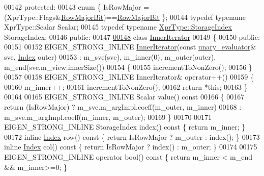 \begin{DoxyCode}
00142   \textcolor{keyword}{protected}:
00143     \textcolor{keyword}{enum} \{ IsRowMajor = (XprType::Flags&\hyperlink{group__flags_gae4f56c2a60bbe4bd2e44c5b19cbe8762}{RowMajorBit})==\hyperlink{group__flags_gae4f56c2a60bbe4bd2e44c5b19cbe8762}{RowMajorBit} \};
00144     \textcolor{keyword}{typedef} \textcolor{keyword}{typename} XprType::Scalar Scalar;
00145     \textcolor{keyword}{typedef} \textcolor{keyword}{typename} \hyperlink{group___sparse_core___module_a0b540ba724726ebe953f8c0df06081ed}{XprType::StorageIndex} StorageIndex;
00146   \textcolor{keyword}{public}:
00147     
\hyperlink{class_eigen_1_1internal_1_1unary__evaluator_3_01_sparse_view_3_01_arg_type_01_4_00_01_index_based_01_4_1_1_inner_iterator}{00148}     \textcolor{keyword}{class }\hyperlink{class_eigen_1_1_inner_iterator}{InnerIterator}
00149     \{
00150       \textcolor{keyword}{public}:
00151 
00152         EIGEN\_STRONG\_INLINE \hyperlink{class_eigen_1_1_inner_iterator}{InnerIterator}(\textcolor{keyword}{const} \hyperlink{struct_eigen_1_1internal_1_1unary__evaluator}{unary\_evaluator}& sve, 
      \hyperlink{namespace_eigen_a62e77e0933482dafde8fe197d9a2cfde}{Index} outer)
00153           : m\_sve(sve), m\_inner(0), m\_outer(outer), m\_end(sve.m\_view.innerSize())
00154         \{
00155           incrementToNonZero();
00156         \}
00157 
00158         EIGEN\_STRONG\_INLINE InnerIterator& operator++()
00159         \{
00160           m\_inner++;
00161           incrementToNonZero();
00162           \textcolor{keywordflow}{return} *\textcolor{keyword}{this};
00163         \}
00164 
00165         EIGEN\_STRONG\_INLINE Scalar value()\textcolor{keyword}{ const}
00166 \textcolor{keyword}{        }\{
00167           \textcolor{keywordflow}{return} (IsRowMajor) ? m\_sve.m\_argImpl.coeff(m\_outer, m\_inner)
00168                               : m\_sve.m\_argImpl.coeff(m\_inner, m\_outer);
00169         \}
00170 
00171         EIGEN\_STRONG\_INLINE StorageIndex index()\textcolor{keyword}{ const }\{ \textcolor{keywordflow}{return} m\_inner; \}
00172         \textcolor{keyword}{inline} \hyperlink{namespace_eigen_a62e77e0933482dafde8fe197d9a2cfde}{Index} row()\textcolor{keyword}{ const }\{ \textcolor{keywordflow}{return} IsRowMajor ? m\_outer : index(); \}
00173         \textcolor{keyword}{inline} \hyperlink{namespace_eigen_a62e77e0933482dafde8fe197d9a2cfde}{Index} col()\textcolor{keyword}{ const }\{ \textcolor{keywordflow}{return} IsRowMajor ? index() : m\_outer; \}
00174 
00175         EIGEN\_STRONG\_INLINE \textcolor{keyword}{operator} bool()\textcolor{keyword}{ const }\{ \textcolor{keywordflow}{return} m\_inner < m\_end && m\_inner>=0; \}

\end{DoxyCode}
